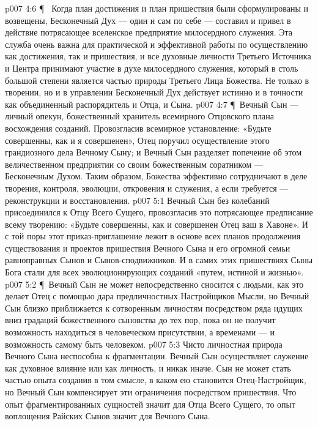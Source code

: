 \vs p007 4:6 \P\ \bibnobreakspace {} Когда план достижения и план пришествия были сформулированы и возвещены, Бесконечный Дух --- один и сам по себе --- составил и привел в действие потрясающее вселенское предприятие милосердного служения. Эта служба очень важна для практической и эффективной работы по осуществлению как достижения, так и пришествия, и все духовные личности Третьего Источника и Центра принимают участие в духе милосердного служения, который в столь большой степени является частью природы Третьего Лица Божества. Не только в творении, но и в управлении Бесконечный Дух действует истинно и в точности как объединенный распорядитель и Отца, и Сына.
\vs p007 4:7 \P\ Вечный Сын --- личный опекун, божественный хранитель всемирного Отцовского плана восхождения созданий. Провозгласив всемирное установление: «Будьте совершенны, как и я совершенен», Отец поручил осуществление этого грандиозного дела Вечному Сыну; и Вечный Сын разделяет попечение об этом величественном предприятии со своим божественным соратником --- Бесконечным Духом. Таким образом, Божества эффективно сотрудничают в деле творения, контроля, эволюции, откровения и служения, а если требуется --- реконструкции и восстановления.
\vs p007 5:1 Вечный Сын без колебаний присоединился к Отцу Всего Сущего, провозгласив это потрясающее предписание всему творению: «Будьте совершенны, как и совершенен Отец ваш в Хавоне». И с той поры этот приказ\hyp{}приглашение лежит в основе всех планов продолжения существования и проектов пришествия Вечного Сына и его огромной семьи равноправных Сынов и Сынов\hyp{}сподвижников. И в самих этих пришествиях Сыны Бога стали для всех эволюционирующих созданий «путем, истиной и жизнью».
\vs p007 5:2 \P\ Вечный Сын не может непосредственно сносится с людьми, как это делает Отец с помощью дара предличностных Настройщиков Мысли, но Вечный Сын близко приближается к сотворенным личностям посредством ряда идущих вниз градаций божественного сыновства до тех пор, пока он не получит возможность находиться в человеческом присутствии, а временами --- и возможность самому быть человеком.
\vs p007 5:3 Чисто личностная природа Вечного Сына неспособна к фрагментации. Вечный Сын осуществляет служение как духовное влияние или как личность, и никак иначе. Сын не может стать частью опыта создания в том смысле, в каком ею становится Отец\hyp{}Настройщик, но Вечный Сын компенсирует эти ограничения посредством пришествия. Что опыт фрагментированных сущностей значит для Отца Всего Сущего, то опыт воплощения Райских Сынов значит для Вечного Сына.
